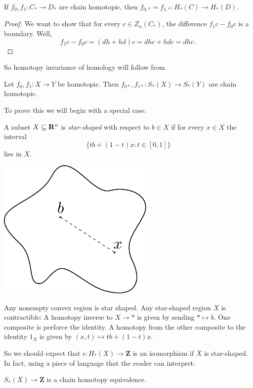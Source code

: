 \begin{lemma}
If $f_0,f_1:C_\ast\to D_\ast$ are chain homotopic, then 
$f_{0,\ast}=f_{1,\ast}: H_\ast(C)\to H_\ast(D)$.
	\end{lemma}
		\begin{proof}
We want to show that for every $c\in Z_n(C_\ast)$, the difference 
$f_1c-f_0c$ is a boundary. Well, 
\[
f_1c-f_0c=(d h+hd)c=d hc+hd c=dhc\,.
\]
		\end{proof}

So homotopy invariance of homology will follow from
\begin{prop}
Let $f_0,f_1:X\to Y$ be homotopic. Then $f_{0*},f_{1*}:S_\ast(X)\to S_\ast(Y)$ are chain homotopic.
\end{prop}

To prove this we will begin with a special case. 
\begin{definition}
A subset $X\subseteq\mathbf R^n$ is {\em star-shaped} with respect to $b\in X$ if
for every $x\in X$ the interval 
\[
\{tb+(1-t)x:t\in[0,1]\}
\]
lies in $X$. 
\end{definition}

\begin{center}
\includegraphics[width=3in]{905/Figures/05-star-shaped.pdf}
\end{center}

Any nonempty convex region is star shaped.
Any star-shaped region $X$ is contractible: A homotopy 
inverse to $X\to\ast$ is given by sending $\ast\mapsto b$. One composite is
perforce the identity. A homotopy from the other composite to the identity
$1_X$ is given by $(x,t)\mapsto tb+(1-t)x$.

So we should expect that $\epsilon:H_*(X)\to\mathbf{Z}$ is an isomorphism 
if $X$ is star-shaped. In fact, using a piece of language that the reader
can interpret:
\begin{prop}
$S_*(X)\to\mathbf{Z}$ is a chain homotopy equivalence.
\end{prop}

